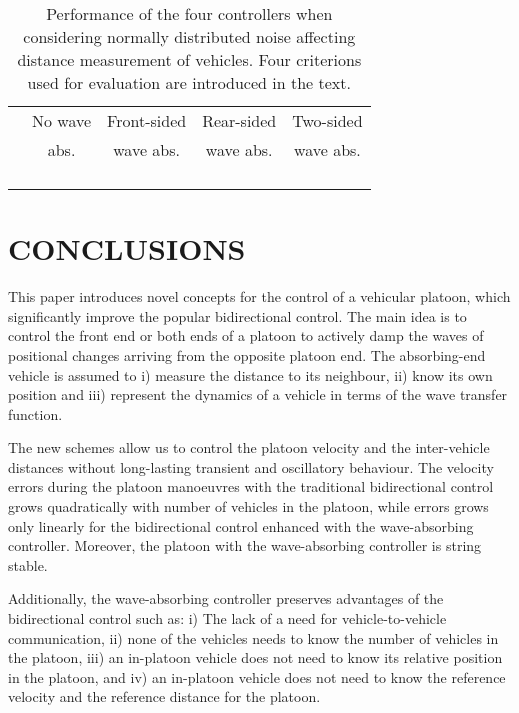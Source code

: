 \documentclass[final,5p,times,twocolumn]{elsarticle}
\begin{document}
\begin{table}[!h]
\renewcommand{\arraystretch}{1.1}
\caption{Performance of the four controllers when considering normally distributed noise affecting distance measurement of vehicles. Four criterions used for evaluation are introduced in the text.}
\label{table_noise}
\centering
\small
\begin{tabular}{|c|c|c|c|c|}
\hline
& No wave & Front-sided &  Rear-sided & Two-sided\\
& abs. & wave abs. & wave abs. & wave abs. \\
\hline
  &  &  &  & \\
\hline
  &  &  &  & \\
\hline
 &  &  &  & \\
\hline
 &  &  &  & \\
\hline
\end{tabular}
\end{table}
\normalsize


\section{CONCLUSIONS}
This paper introduces novel concepts for the control of a vehicular platoon, which significantly improve the popular bidirectional control. The main idea is to control the front end or both ends of a platoon to actively damp the waves of positional changes arriving from the opposite platoon end. The absorbing-end vehicle is assumed to i) measure the distance to its neighbour, ii) know its own position and iii) represent the dynamics of a vehicle in terms of the wave transfer function.

The new schemes allow us to control the platoon velocity and the inter-vehicle distances without long-lasting transient and oscillatory behaviour. The velocity errors during the platoon manoeuvres with the traditional bidirectional control grows quadratically with number of vehicles in the platoon, while errors grows only linearly for the bidirectional control enhanced with the wave-absorbing controller. Moreover, the platoon with the wave-absorbing controller is string stable. 

Additionally, the wave-absorbing controller preserves advantages of the bidirectional control such as: i) The lack of a need for vehicle-to-vehicle communication, ii) none of the vehicles needs to know the number of vehicles in the platoon, iii) an in-platoon vehicle does not need to know its relative position in the platoon, and iv) an in-platoon vehicle does not need to know the reference velocity and the reference distance for the platoon.
\end{document}
